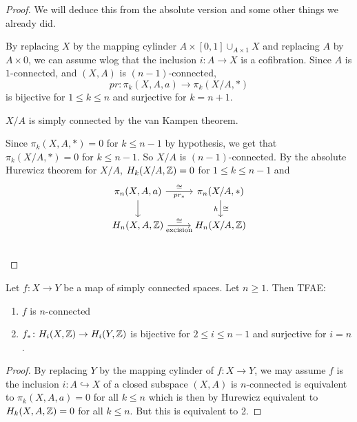 \documentclass[language=english]{TemplateLecture}
\begin{document}
\begin{proof}
    We will deduce this from the absolute version and some other things we already did.

    By replacing \(X\) by the mapping cylinder \(A\times [0,1]\cup_{A\times 1} X\) and replacing \(A\) by \(A\times 0\), we can assume wlog that the inclusion \(i\colon A \to X\) is a cofibration. Since \(A\) is \(1\)-connected, and \((X,A)\) is \((n-1)\)-connected,
    \[pr\colon \pi_k(X,A,a) \to \pi_k(X/A, *)\]
    is bijective for \(1\leq k\leq n\) and surjective for \(k = n+1\).

    \(X/A\) is simply connected by the van Kampen theorem.

    Since \(\pi_k(X,A,*) = 0\) for \(k\leq n-1\) by hypothesis, we get that \(\pi_k(X/A, *) = 0\) for \(k\leq n-1\). So \(X/A\) is \((n-1)\)-connected. By the absolute Hurewicz theorem for \(X/A\), \(H_k(X/A, \mathbb{Z}) = 0\) for \(1 \leq k\leq n-1\) and
    \[\begin{tikzcd}
        \pi_n(X,A,a) \ar[r, "\cong", "pr_*"'] \ar[d] & \pi_n(X/A, *) \ar[d, "\cong", "h"']\\
        H_n(X,A,\iz) \ar[r, "\cong", "\text{excision}"'] & H_n(X/A, \iz) \\
    \end{tikzcd}\]
\end{proof}


\begin{proposition}
    Let \(f\colon X \to Y \) be a map of simply connected spaces. Let \(n \geq 1\). Then TFAE:
    \begin{enumerate}
        \item \(f\) is \(n\)-connected
        \item \(f_*\colon H_i(X,\mathbb{Z}) \to H_i(Y, \mathbb{Z})\) is bijective for \(2 \leq i \leq n-1\) and surjective for \(i = n\).
    \end{enumerate}
\end{proposition}

\begin{proof}
    By replacing \(Y\) by the mapping cylinder of \(f\colon X\to Y\), we may assume \(f\) is the inclusion \(i\colon A \hookrightarrow X\) of a closed subspace \((X,A)\) is \(n\)-connected is equivalent to \(\pi_k(X,A,a) = 0\) for all \(k \leq n\) which is then by Hurewicz equivalent to \(H_k(X,A,\mathbb{Z}) = 0\) for all \(k \leq n\). But this is equivalent to 2.
\end{proof}
\end{document}
